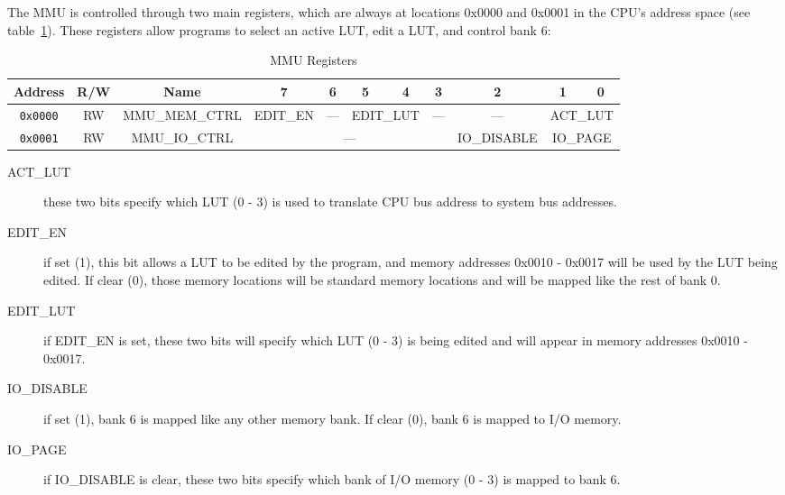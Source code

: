 The MMU is controlled through two main registers, which are always at locations 0x0000 and 0x0001 in the CPU's address space (see table~\ref{tab:mmu_registers}). These registers allow programs to select an active LUT, edit a LUT, and control bank 6:

\begin{table}[ht]
	\begin{center}
		\begin{tabular}{| c | c | c || c | c | c | c | c | c | c | c |} \hline
			Address & R/W & Name & 7 & 6 & 5 & 4 & 3 & 2 & 1 & 0 \\ \hline\hline
			\verb+0x0000+ & RW & MMU\_MEM\_CTRL & EDIT\_EN & --- & \multicolumn{2}{|c|}{EDIT\_LUT} & --- & --- & \multicolumn{2}{|c|}{ACT\_LUT} \\ \hline
			\verb+0x0001+ & RW & MMU\_IO\_CTRL & \multicolumn{5}{|c|}{---} & IO\_DISABLE & \multicolumn{2}{|c|}{IO\_PAGE} \\ \hline
		\end{tabular}
	\end{center}
	\caption{MMU Registers}
	\label{tab:mmu_registers}
\end{table}

\begin{description}
	\item[ACT\_LUT] these two bits specify which LUT (0 - 3) is used to translate CPU bus address to system bus addresses.

	\item[EDIT\_EN] if set (1), this bit allows a LUT to be edited by the program, and memory addresses 0x0010 - 0x0017 will be used by the LUT being edited. If clear (0), those memory locations will be standard memory locations and will be mapped like the rest of bank 0.

	\item[EDIT\_LUT] if EDIT\_EN is set, these two bits will specify which LUT (0 - 3) is being edited and will appear in memory addresses 0x0010 - 0x0017.

	\item[IO\_DISABLE] if set (1), bank 6 is mapped like any other memory bank. If clear (0), bank 6 is mapped to I/O memory.

	\item[IO\_PAGE] if IO\_DISABLE is clear, these two bits specify which bank of I/O memory (0 - 3) is mapped to bank 6.
\end{description}


